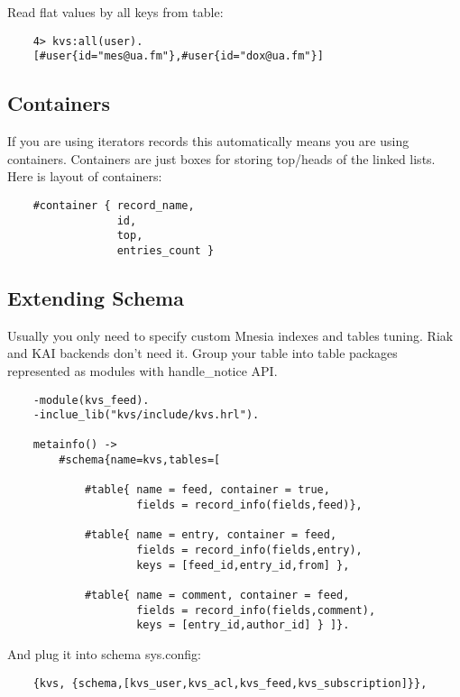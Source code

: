 Read flat values by all keys from table:

\begin{lstlisting}
    4> kvs:all(user).
    [#user{id="mes@ua.fm"},#user{id="dox@ua.fm"}]
\end{lstlisting}

\subsection{Containers}

If you are using iterators records this automatically
means you are using containers. Containers are just boxes
for storing top/heads of the linked lists. Here is layout
of containers:

\begin{lstlisting}
    #container { record_name,
                 id,
                 top,
                 entries_count }
\end{lstlisting}

\subsection{Extending Schema}

Usually you only need to specify custom Mnesia indexes and tables tuning.
Riak and KAI backends don't need it. Group your table into table packages
represented as modules with handle\_notice API.

\begin{lstlisting}
    -module(kvs_feed).
    -inclue_lib("kvs/include/kvs.hrl").

    metainfo() ->
        #schema{name=kvs,tables=[

            #table{ name = feed, container = true,
                    fields = record_info(fields,feed)},

            #table{ name = entry, container = feed,
                    fields = record_info(fields,entry),
                    keys = [feed_id,entry_id,from] },

            #table{ name = comment, container = feed,
                    fields = record_info(fields,comment),
                    keys = [entry_id,author_id] } ]}.
\end{lstlisting}

And plug it into schema sys.config:

\begin{lstlisting}
    {kvs, {schema,[kvs_user,kvs_acl,kvs_feed,kvs_subscription]}},
\end{lstlisting}

